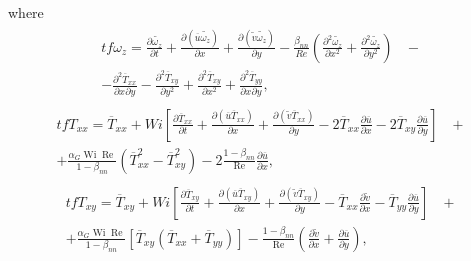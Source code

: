 \documentclass[preprint, 12pt]{elsarticle}
\begin{document}
where
\begin{gather}
    \begin{aligned}
        tf\omega_{z} = \frac{\partial \widetilde{\omega_{z}}}{\partial t} + \frac{\partial (\overline{u}\widetilde{\omega_{z}})}{\partial x} + \frac{\partial (\widetilde{v}\widetilde{\omega_{z}})}{\partial y} - \frac{\beta_{nn}}{Re}\left(\frac{\partial^{2} \widetilde{\omega_{z}}}{\partial x^{2}} + \frac{\partial^{2} \widetilde{\omega_{z}}}{\partial y^{2}}\right) &~- \\ - \frac{\partial^{2}\overline{T}_{xx}}{\partial x^{}\partial y^{}} - \frac{\partial^{2}\overline{T}_{xy}}{\partial y^{2}} + \frac{\partial^{2}\overline{T}_{xy}}{\partial x^{2}} + \frac{\partial^{2}\overline{T}_{yy}}{\partial x^{}\partial y^{}},\label{eqwz_s_t_2}
    \end{aligned}
\end{gather}
\begin{gather}
    \begin{aligned}
        tfT_{xx} = \overline{T}_{xx} + Wi\left[\frac{\partial \overline{T}_{xx}}{\partial t} + \frac{\partial (\overline{u}\overline{T}_{xx})}{\partial x} + \frac{\partial (\widetilde{v}\overline{T}_{xx})}{\partial y} - 2\overline{T}_{xx}\frac{\partial \overline{u}}{\partial x} - 2\overline{T}_{xy}\frac{\partial \overline{u}}{\partial y}\right] &~+ \\ + \frac{\alpha_{G}\operatorname{Wi}\operatorname{Re}}{1-\beta_{nn}}\left(\overline{T}_{xx}^{2} - \overline{T}_{xy}^{2}\right) - 2\frac{1-\beta_{nn}}{\operatorname{Re}}\frac{\partial \overline{u}}{\partial x},\label{eqtxx_s_t_2}
    \end{aligned}
\end{gather}
\begin{gather}
    \begin{aligned}
        tfT_{xy} = \overline{T}_{xy} + Wi\left[\frac{\partial \overline{T}_{xy}}{\partial t} + \frac{\partial (\overline{u}\overline{T}_{xy})} {\partial x} + \frac{\partial(\widetilde{v}\overline{T}_{xy})}{\partial y} - \overline{T}_{xx}\frac{\partial\widetilde{v}}{\partial x} - \overline{T}_{yy}\frac{\partial \overline{u}}{\partial y}\right] &~+ \\ + \frac{\alpha_{G}\operatorname{Wi}\operatorname{Re}}{1-\beta_{nn}}\left[\overline{T}_{xy}\left(\overline{T}_{xx} + \overline{T}_{yy}\right)\right] - \frac{1-\beta_{nn}}{\operatorname{Re}}\left(\frac{\partial\widetilde{v}}{\partial x} + \frac{\partial \overline{u}}{\partial y}\right),\label{eqtxy_s_t_2}
    \end{aligned}
\end{gather}
\end{document}
